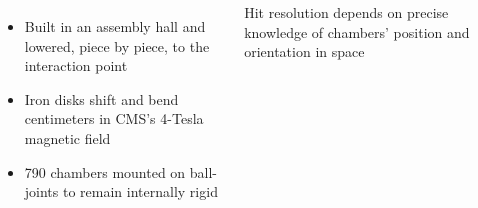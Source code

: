 \documentclass[compress]{beamer}
\begin{document}
\begin{frame}
\begin{columns}
\vspace{-0.5 cm}
\begin{itemize}
\item Built in an assembly hall and lowered, piece by piece, to the interaction point
\item Iron disks shift and bend centimeters in CMS's 4-Tesla magnetic field
\item 790 chambers mounted on ball-joints to remain internally rigid
\end{itemize}

\vspace{0.25 cm}
\hfill \begin{minipage}{0.95\linewidth}
Hit resolution depends on precise knowledge of chambers' position and orientation in space
\end{minipage} \hfill \mbox{ }

\end{columns}
\end{frame}
\end{document}
